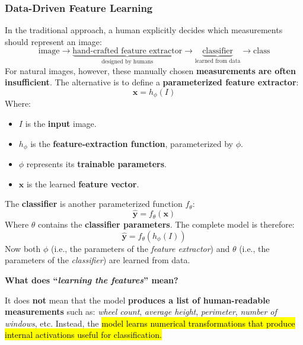 \subsubsection{Data-Driven Feature Learning}\label{sec:data-driven-feature-learning}

In the traditional approach, a human explicitly decides which measurements should represent an image:
\begin{equation*}
    \text{image} \to \underbrace{\text{hand-crafted feature extractor}}_{\text{designed by humans}} \to \underbrace{\text{classifier}}_{\text{learned from data}} \to \text{class}
\end{equation*}
For natural images, however, these manually chosen \textbf{measurements are often insufficient}. The alternative is to define a \textbf{parameterized feature extractor}:
\begin{equation*}
    \mathbf{x} = h_{\phi}(I)
\end{equation*}
Where:
\begin{itemize}
    \item $I$ is the \textbf{input} image.
    \item $h_{\phi}$ is the \textbf{feature-extraction function}, parameterized by $\phi$.
    \item $\phi$ represents its \textbf{trainable parameters}.
    \item $\mathbf{x}$ is the learned \textbf{feature vector}.
\end{itemize}
The \textbf{classifier} is another parameterized function $f_{\theta}$:
\begin{equation*}
    \hat{\mathbf{y}} = f_{\theta}\left(\mathbf{x}\right)
\end{equation*}
Where $\theta$ contains the \textbf{classifier parameters}. The complete model is therefore:
\begin{equation*}
    \hat{\mathbf{y}} = f_{\theta}\left(h_{\phi}(I)\right)
\end{equation*}
Now both $\phi$ (i.e., the parameters of the \emph{feature extractor}) and $\theta$ (i.e., the parameters of the \emph{classifier}) are learned from data.

\highspace
\begin{flushleft}
    \textcolor{Green3}{ \textbf{What does ``\emph{learning the features}'' mean?}}
\end{flushleft}
It does \textbf{not} mean that the model \textbf{produces a list of human-readable measurements} such as: \emph{wheel count}, \emph{average height}, \emph{perimeter}, \emph{number of windows}, etc. Instead, the \hl{model learns numerical transformations that produce internal activations useful for classification.}

